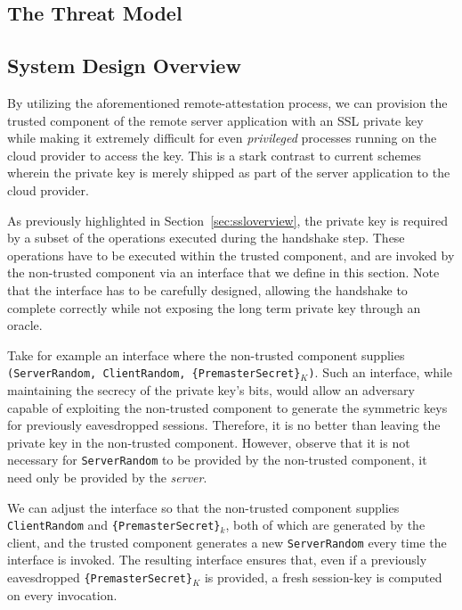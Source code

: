 \documentclass[../main.tex]{subfiles}
\begin{document}
\subsection{The Threat Model}


\subsection{System Design Overview}%
By utilizing the aforementioned remote-attestation process, we can
provision the trusted component of the remote server application with
an SSL private key while making it extremely difficult for even
\textit{privileged} processes running on the cloud provider to access
the key. This is a stark contrast to current schemes wherein the
private key is merely shipped as part of the server application to the
cloud provider.

As previously highlighted in Section~\ref{sec:ssloverview}, the
private key is required by a subset of the operations executed during
the handshake step. These operations have to be executed within the
trusted component, and are invoked by the non-trusted component via an
interface that we define in this section. Note that the interface has
to be carefully designed, allowing the handshake to complete correctly
while not exposing the long term private key through an oracle.



Take for example an interface where the non-trusted component supplies
\texttt{(ServerRandom, ClientRandom, \{PremasterSecret\}$_K$)}. Such
an interface, while maintaining the secrecy of the private key's bits,
would allow an adversary capable of exploiting the non-trusted
component to generate the symmetric keys for previously eavesdropped
sessions. Therefore, it is no better than leaving the private key in
the non-trusted component.  However, observe that it is not necessary
for \texttt{ServerRandom} to be provided by the non-trusted component,
it need only be provided by the \textit{server}.


We can adjust the interface so that the non-trusted component supplies
\texttt{ClientRandom} and \texttt{\{PremasterSecret\}$_k$}, both of
which are generated by the client, and the trusted component generates
a new \texttt{ServerRandom} every time the interface is invoked. The
resulting interface ensures that, even if a previously eavesdropped
\texttt{\{PremasterSecret\}$_K$} is provided, a fresh session-key is
computed on every invocation.
\end{document}
